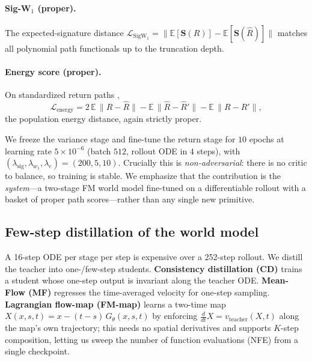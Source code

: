 \documentclass[11pt]{article}
\newcommand{\E}{\mathbb{E}}
\begin{document}
\paragraph{Sig-W$_1$ (proper).} The expected-signature distance
\citep{ni2021sigwgan,ni2020conditional}
$\mathcal L_{\mathrm{SigW_1}}=\big\|\E[\mathbf S(R)]-\E[\mathbf S(\hat R)]\big\|$
matches all polynomial path functionals up to the truncation depth.

\paragraph{Energy score (proper).} On standardized return paths
\citep{pacchiardi2024probabilistic},
\begin{equation}
\mathcal L_{\mathrm{energy}}
= 2\,\E\,\|R-\hat R\| - \E\,\|\hat R-\hat R'\| - \E\,\|R-R'\|,
\end{equation}
the population energy distance, again strictly proper.

We freeze the variance stage and fine-tune the return stage for $10$ epochs at
learning rate $5\!\times\!10^{-6}$ (batch $512$, rollout ODE in $4$ steps), with
$(\lambda_{\mathrm{sig}},\lambda_{w_1},\lambda_e)=(200,5,10)$. Crucially this is
\emph{non-adversarial}: there is no critic to balance, so training is stable. We
emphasize that the contribution is the \emph{system}---a two-stage FM world model
fine-tuned on a differentiable rollout with a basket of proper path scores---rather
than any single new primitive.

\subsection{Few-step distillation of the world model}
\label{sec:distill}
A 16-step ODE per stage per step is expensive over a 252-step rollout. We distill
the teacher into one-/few-step students.
\textbf{Consistency distillation (CD)} \citep{song2023consistency,song2024improved}
trains a student whose one-step output is invariant along the teacher ODE.
\textbf{Mean-Flow (MF)} \citep{geng2025meanflow} regresses the time-averaged
velocity for one-step sampling.
\textbf{Lagrangian flow-map (FM-map)} \citep{boffi2025flowmaps} learns a two-time
map $X(x,s,t)=x-(t-s)\,G_\theta(x,s,t)$ by enforcing
$\tfrac{d}{dt}X=v_{\mathrm{teacher}}(X,t)$ along the map's own trajectory; this
needs no spatial derivatives and supports $K$-step composition, letting us sweep
the number of function evaluations (NFE) from a single checkpoint.
\end{document}
